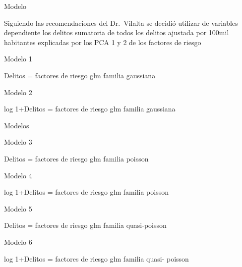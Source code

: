 \documentclass[ignorenonframetext,]{beamer}
\begin{document}
\begin{frame}{Modelo}

Siguiendo las recomendaciones del Dr.~Vilalta se decidió utilizar de
variables dependiente los delitos sumatoria de todos los delitos
ajustada por 100mil habitantes explicadas por los PCA 1 y 2 de los
factores de riesgo

\begin{block}{Modelo 1}

Delitos = factores de riesgo glm familia gaussiana

\end{block}

\begin{block}{Modelo 2}

log 1+Delitos = factores de riesgo glm familia gaussiana

\end{block}

\end{frame}

\begin{frame}{Modelos}

\begin{block}{Modelo 3}

Delitos = factores de riesgo glm familia poisson

\end{block}

\begin{block}{Modelo 4}

log 1+Delitos = factores de riesgo glm familia poisson

\end{block}

\begin{block}{Modelo 5}

Delitos = factores de riesgo glm familia quasi-poisson

\end{block}

\begin{block}{Modelo 6}

log 1+Delitos = factores de riesgo glm familia quasi- poisson

\end{block}

\end{frame}
\end{document}
